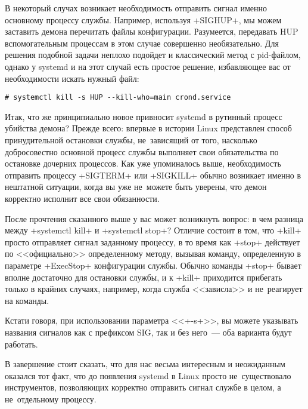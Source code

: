 \documentclass[10pt,oneside,a4paper]{article}
\begin{document}
В некоторый случах возникает необходимость отправить сигнал именно основному
процессу службы. Например, используя +SIGHUP+, мы можем заставить демона
перечитать файлы конфигурации. Разумеется, передавать HUP вспомогательным процессам
в этом случае совершенно необязательно. Для решения подобной
задачи неплохо подойдет и классический метод с pid-файлом, однако у
systemd и на этот случай есть простое решение, избавляющее вас от
необходимости искать нужный файл: 

\begin{Verbatim}
# systemctl kill -s HUP --kill-who=main crond.service
\end{Verbatim}

Итак, что же принципиально новое привносит systemd в рутинный процесс
убийства демона? Прежде всего: впервые в истории Linux представлен способ
принудительной остановки службы, не~зависящий от того, насколько
добросовестно основной процесс службы выполняет свои обязательства по
остановке дочерних процессов. Как уже упоминалось выше, необходимость
отправить процессу +SIGTERM+ или +SIGKILL+ обычно возникает именно
в нештатной ситуации, когда вы уже не~можете быть уверены, что демон
корректно исполнит все свои обязанности.

После прочтения сказанного выше у вас может возникнуть вопрос: в чем разница
между +systemctl kill+ и +systemctl stop+? Отличие состоит в том,
что +kill+ просто отправляет сигнал заданному процессу, в то время как
+stop+ действует по <<официально>> определенному методу, вызывая команду,
определенную в параметре +ExecStop+ конфигурации службы. Обычно команды
+stop+ бывает вполне достаточно для остановки службы, и к +kill+
приходится прибегать только в крайних случаях, например, когда служба
<<зависла>> и не~реагирует на команды.

Кстати говоря, при использовании параметра <<+-s+>>, вы можете указывать
названия сигналов как с префиксом SIG, так и без него~--- оба варианта будут
работать.

В завершение стоит сказать, что для нас весьма интересным и неожиданным
оказался тот факт, что до появления systemd в Linux просто не~существовало
инструментов, позволяющих корректно отправить сигнал службе в целом, а
не~отдельному процессу.
\end{document}
